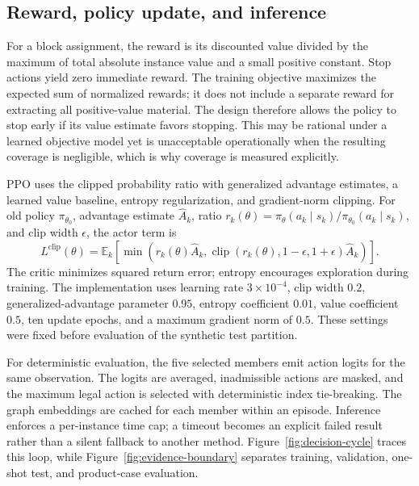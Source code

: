 \documentclass[11pt]{article}
\begin{document}
\subsection{Reward, policy update, and inference}
For a block assignment, the reward is its discounted value divided by the maximum of total absolute instance value and a small positive constant. Stop actions yield zero immediate reward. The training objective maximizes the expected sum of normalized rewards; it does not include a separate reward for extracting all positive-value material. The design therefore allows the policy to stop early if its value estimate favors stopping. This may be rational under a learned objective model yet is unacceptable operationally when the resulting coverage is negligible, which is why coverage is measured explicitly.

PPO uses the clipped probability ratio with generalized advantage estimates, a learned value baseline, entropy regularization, and gradient-norm clipping. For old policy $\pi_{\theta_0}$, advantage estimate $\hat A_k$, ratio $r_k(\theta)=\pi_\theta(a_k\mid s_k)/\pi_{\theta_0}(a_k\mid s_k)$, and clip width $\epsilon$, the actor term is
\begin{equation}
L^{\mathrm{clip}}(\theta)=\mathbb E_k\left[\min\left(r_k(\theta)\hat A_k,\operatorname{clip}(r_k(\theta),1-\epsilon,1+\epsilon)\hat A_k\right)\right].
\label{eq:ppo}
\end{equation}
The critic minimizes squared return error; entropy encourages exploration during training. The implementation uses learning rate $3\times10^{-4}$, clip width $0.2$, generalized-advantage parameter $0.95$, entropy coefficient $0.01$, value coefficient $0.5$, ten update epochs, and a maximum gradient norm of $0.5$. These settings were fixed before evaluation of the synthetic test partition.

For deterministic evaluation, the five selected members emit action logits for the same observation. The logits are averaged, inadmissible actions are masked, and the maximum legal action is selected with deterministic index tie-breaking. The graph embeddings are cached for each member within an episode. Inference enforces a per-instance time cap; a timeout becomes an explicit failed result rather than a silent fallback to another method. Figure~\ref{fig:decision-cycle} traces this loop, while Figure~\ref{fig:evidence-boundary} separates training, validation, one-shot test, and product-case evaluation.
\end{document}

